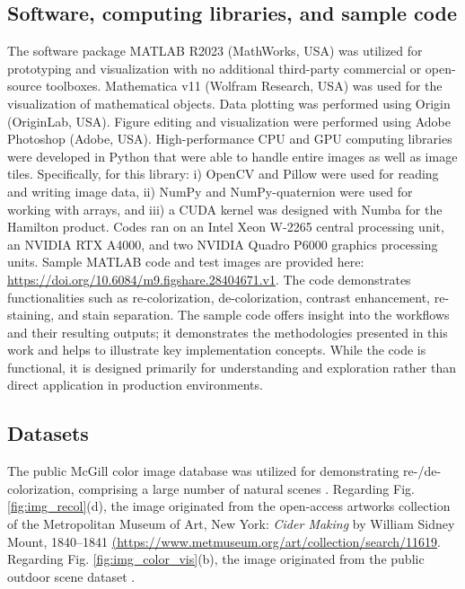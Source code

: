 \documentclass[superscriptaddress,longbibliography,aps,prl,twocolumn,10pt]{revtex4-2}
\begin{document}
\subsection*{\normalsize{Software, computing libraries, and sample code}}
The software package MATLAB R2023 (MathWorks, USA) was utilized for prototyping and visualization with no additional third-party commercial or open-source toolboxes. Mathematica v11 (Wolfram Research, USA) was used for the visualization of mathematical objects. Data plotting was performed using Origin (OriginLab, USA). Figure editing and visualization were performed using Adobe Photoshop (Adobe, USA). High-performance CPU and GPU computing libraries were developed in Python that were able to handle entire images as well as image tiles. Specifically, for this library: i) OpenCV \cite{opencv_library} and Pillow \cite{clark2015pillow} were used for reading and writing image data, ii) NumPy \cite{Harris2020} and NumPy-quaternion were used for working with arrays, and iii) a CUDA \cite{cuda} kernel was designed with Numba \cite{lam2015numba} for the Hamilton product. Codes ran on an Intel Xeon W-2265 central processing unit, an NVIDIA RTX A4000, and two NVIDIA Quadro P6000 graphics processing units. Sample MATLAB code and test images are provided here: \url{https://doi.org/10.6084/m9.figshare.28404671.v1}. The code demonstrates functionalities such as re-colorization, de-colorization, contrast enhancement, re-staining, and stain separation. The sample code offers insight into the workflows and their resulting outputs; it demonstrates the methodologies presented in this work and helps to illustrate key implementation concepts. While the code is functional, it is designed primarily for understanding and exploration rather than direct application in production environments.

\subsection*{\normalsize{Datasets}}
The public McGill color image database was utilized for demonstrating re-/de-colorization, comprising a large number of natural scenes \cite{Olmos2004}. Regarding Fig. \ref{fig:img_recol}(d), the image originated from the open-access artworks collection of the Metropolitan Museum of Art, New York: \textit{Cider Making} by William Sidney Mount, 1840–1841 \url{(https://www.metmuseum.org/art/collection/search/11619}. Regarding Fig. \ref{fig:img_color_vis}(b), the image originated from the public outdoor scene dataset \cite{Wang2018}.
\end{document}
